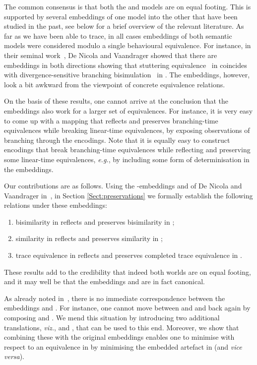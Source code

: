 \documentclass{llncs}
\newcommand{\eg}{\emph{e.g.}}
\newcommand{\viz}{\emph{viz.}}
\begin{document}
The common consensus is that both the \KS and \LTS models are on
equal footing. This is supported by several embeddings of one model
into the other that have been studied in the past, see below for a
brief overview of the relevant literature.  As far as we have been
able to trace, in all cases embeddings of both semantic models were
considered modulo a single behavioural equivalence. For instance, in
their seminal work~\cite{DBLP:journals/jacm/NicolaV95}, De Nicola and
Vaandrager showed that there are embeddings in both directions showing
that stuttering equivalence~\cite{DBLP:journals/tcs/BrowneCG88}
in \KS coincides with divergence-sensitive branching
bisimulation~\cite{vanGlabbeek96} in \LTS. The embeddings, however,
look a bit awkward from the viewpoint of concrete equivalence relations.

On the basis of these results, one cannot arrive at the conclusion that
the embeddings also work for a larger set of equivalences. For instance,
it is very easy to come up with a mapping that reflects and preserves
branching-time equivalences while breaking linear-time equivalences, by
exposing observations of branching through the encodings.  Note that it is
equally easy to construct encodings that break branching-time equivalences
while reflecting and preserving some linear-time equivalences, \eg,
by including some form of determinisation in the embeddings.

Our contributions are as follows. Using the
\KS-\LTS embeddings  and  of De Nicola and
Vaandrager in~\cite{DBLP:conf/litp/NicolaV90}, in Section \ref{Sect:preservations} we formally establish the
following relations under these embeddings:
\begin{enumerate}
\item bisimilarity in \KS reflects and preserves bisimilarity in \LTS;
\item similarity in \KS reflects and preserves similarity in \LTS;
\item trace equivalence in \KS reflects and preserves completed trace equivalence
in \LTS.
\end{enumerate}
These results add to the credibility that indeed both worlds are on
equal footing, and it may well be that the embeddings  and 
are in fact canonical.

As already noted in~\cite{DBLP:conf/litp/NicolaV90}, there is no
immediate correspondence between the embeddings  and .
For instance, one cannot move between \KS and \LTS and back again by
composing  and . We mend this situation by introducing two
additional translations, \viz,  and , that can be used
to this end. Moreover, we show that combining these with the original
embeddings enables one to minimise with respect to an equivalence in
\KS by minimising the embedded artefact in \LTS (and \emph{vice versa}).
\end{document}
